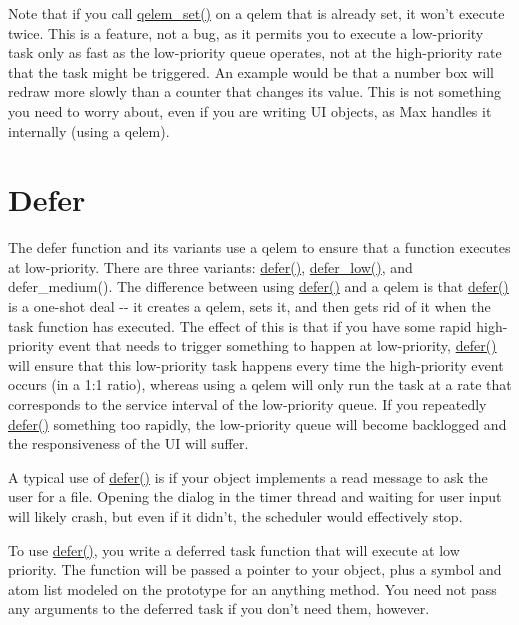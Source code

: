 Note that if you call \hyperlink{group__qelems_ga3e292aad133af89a87e167e88cc4a1b5}{qelem\_\-set()} on a qelem that is already set, it won't execute twice. This is a feature, not a bug, as it permits you to execute a low-\/priority task only as fast as the low-\/priority queue operates, not at the high-\/priority rate that the task might be triggered. An example would be that a number box will redraw more slowly than a counter that changes its value. This is not something you need to worry about, even if you are writing UI objects, as Max handles it internally (using a qelem).\hypertarget{chapter_scheduler_chapter_scheduler_defer}{}\section{Defer}\label{chapter_scheduler_chapter_scheduler_defer}
The defer function and its variants use a qelem to ensure that a function executes at low-\/priority. There are three variants: \hyperlink{group__threading_gaa24a0c9896f1ad241e45590065c3f643}{defer()}, \hyperlink{group__threading_ga486daa40ddb16f70b663615695d18315}{defer\_\-low()}, and defer\_\-medium(). The difference between using \hyperlink{group__threading_gaa24a0c9896f1ad241e45590065c3f643}{defer()} and a qelem is that \hyperlink{group__threading_gaa24a0c9896f1ad241e45590065c3f643}{defer()} is a one-\/shot deal -\/-\/ it creates a qelem, sets it, and then gets rid of it when the task function has executed. The effect of this is that if you have some rapid high-\/priority event that needs to trigger something to happen at low-\/priority, \hyperlink{group__threading_gaa24a0c9896f1ad241e45590065c3f643}{defer()} will ensure that this low-\/priority task happens every time the high-\/priority event occurs (in a 1:1 ratio), whereas using a qelem will only run the task at a rate that corresponds to the service interval of the low-\/priority queue. If you repeatedly \hyperlink{group__threading_gaa24a0c9896f1ad241e45590065c3f643}{defer()} something too rapidly, the low-\/priority queue will become backlogged and the responsiveness of the UI will suffer.

A typical use of \hyperlink{group__threading_gaa24a0c9896f1ad241e45590065c3f643}{defer()} is if your object implements a read message to ask the user for a file. Opening the dialog in the timer thread and waiting for user input will likely crash, but even if it didn't, the scheduler would effectively stop.

To use \hyperlink{group__threading_gaa24a0c9896f1ad241e45590065c3f643}{defer()}, you write a deferred task function that will execute at low priority. The function will be passed a pointer to your object, plus a symbol and atom list modeled on the prototype for an anything method. You need not pass any arguments to the deferred task if you don't need them, however.


